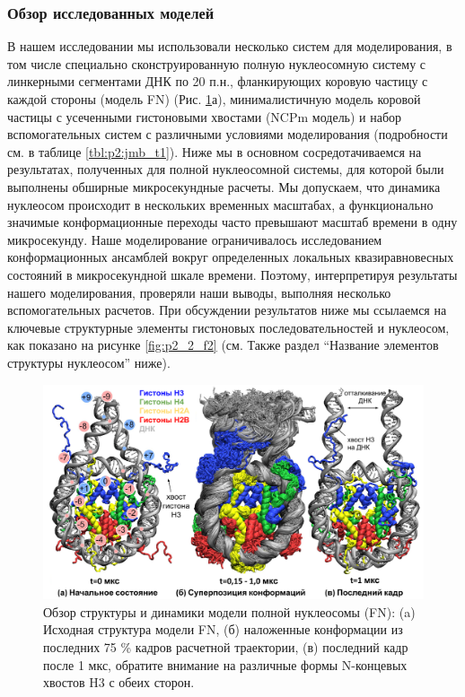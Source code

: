 \subsubsection{Обзор исследованных моделей}
В нашем исследовании мы использовали несколько систем для моделирования, в том числе специально сконструированную полную нуклеосомную систему с линкерными сегментами ДНК по 20 п.н., фланкирующих коровую частицу с каждой стороны (модель FN) (Рис. \ref{fig:p2_2_f1}а), минималистичную модель коровой частицы с усеченными гистоновыми хвостами (NCPm модель) и набор вспомогательных систем с различными условиями моделирования (подробности см. в таблице \ref{tbl:p2:jmb_t1}). Ниже мы в основном сосредотачиваемся на результатах, полученных для полной нуклеосомной системы, для которой были выполнены обширные микросекундные расчеты. Мы допускаем, что динамика нуклеосом происходит в нескольких временных масштабах, а функционально значимые конформационные переходы часто превышают масштаб времени в одну микросекунду. Наше моделирование ограничивалось исследованием конформационных ансамблей вокруг определенных локальных квазиравновесных состояний в микросекундной шкале времени. Поэтому, интерпретируя результаты нашего моделирования, проверяли наши выводы, выполняя несколько вспомогательных расчетов. При обсуждении результатов ниже мы ссылаемся на ключевые структурные элементы гистоновых последовательностей и нуклеосом, как показано на рисунке \ref{fig:p2_2_f2} (см. Также раздел ``Название элементов структуры нуклеосом'' ниже).




\begin{figure} [H]
    \centering
    \includegraphics[width=\textwidth]{images/p2/jmb/part2_2_f1.pdf}
    \caption[Обзор структуры и динамики модели полной нуклеосомы (FN)]{Обзор структуры и динамики модели полной нуклеосомы (FN): (a) Исходная структура модели FN, (б) наложенные конформации из последних 75 \% кадров расчетной траектории, (в) последний кадр после 1 мкс, обратите внимание на различные формы N-концевых хвостов H3 с обеих сторон.}
    \label{fig:p2_2_f1}
\end{figure}

